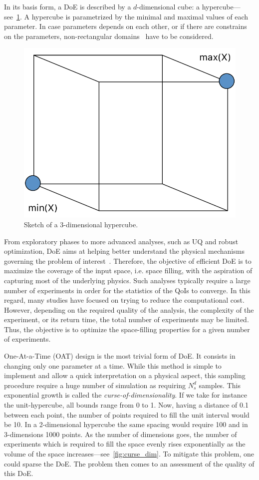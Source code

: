 In its basis form, a DoE is described by a $d$-dimensional cube: a hypercube---see~\cref{fig:sketch_hypercube}. A hypercube is parametrized by the minimal and maximal values of each parameter. In case parameters depends on each other, or if there are constrains on the parameters, non-rectangular domains~\citep{Lekivetz2015} have to be considered.

\begin{figure}[!ht]
\centering
\includegraphics[width=0.5\linewidth,keepaspectratio]{fig/literature/hypercube.pdf}
\caption{Sketch of a 3-dimensional hypercube.}
\label{fig:sketch_hypercube}
\end{figure}

From exploratory phases to more advanced analyses, such as UQ and robust optimization, DoE aims at helping better understand the physical mechanisms governing the problem of interest~\citep{Saltelli2007}. Therefore, the objective of efficient DoE is to maximize the coverage of the input space, i.e. space filling, with the aspiration of capturing most of the underlying physics. Such analyses typically require a large number of experiments in order for the statistics of the QoIs to converge. In this regard, many studies have focused on trying to reduce the computational cost. However, depending on the required quality of the analysis, the complexity of the experiment, or its return time, the total number of experiments may be limited. Thus, the objective is to optimize the space-filling properties for a given number of experiments.

One-At-a-Time (OAT) design is the most trivial form of DoE. It consists in changing only one parameter at a time. While this method is simple to implement and allow a quick interpretation on a physical aspect, this sampling procedure require a huge number of simulation as requiring $N_s^d$ samples. This exponential growth is called the \emph{curse-of-dimensionality}. If we take for instance the unit-hypercube, all bounds range from 0 to 1. Now, having a distance of 0.1 between each point, the number of points required to fill the unit interval would be 10. In a 2-dimensional hypercube the same spacing would require 100 and in 3-dimensions 1000 points. As the number of dimensions goes, the number of experiments which is required to fill the space evenly rises exponentially as the volume of the space increases---see~\cref{fig:curse_dim}. To mitigate this problem, one could sparse the DoE. The problem then comes to an assessment of the quality of this DoE.


